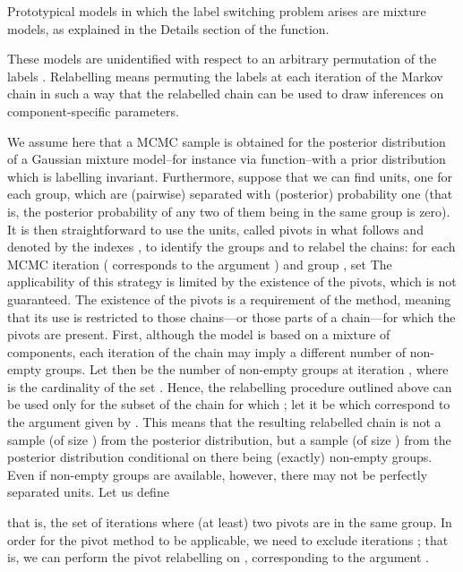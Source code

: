 \documentclass[a4paper]{book}
\begin{document}
\begin{Details}\relax
Prototypical models in which the label switching problem arises
are mixture models, as explained in the Details section of
the  function.

These models are unidentified with respect to an arbitrary permutation
of the labels . Relabelling means permuting
the labels at each iteration of the Markov chain in such
a way that the relabelled chain can be used to draw inferences
on component-specific parameters.


We assume here that a MCMC sample is obtained for the
posterior distribution of a Gaussian mixture model--for instance via
 function--with a prior distribution which is
labelling invariant.
Furthermore, suppose that we can find  units, one
for each group, which are (pairwise) separated with (posterior)
probability one
(that is, the posterior probability of any two of them being
in the same group
is zero).
It is then straightforward to use the  units,
called pivots in what follows and denoted by the indexes
, to identify the groups and to
relabel the chains:
for each MCMC iteration  ( corresponds to
the argument ) and group
, set
The applicability of this strategy is limited by the existence of the pivots,
which is not guaranteed. The existence of the pivots is a requirement of the
method, meaning that its use is restricted to those chains—or
those parts of a chain—for which the pivots are present. First, although the
model is based on a mixture of  components, each iteration of the chain
may imply a different number of non-empty groups. Let then 
be the number of non-empty groups at iteration ,
where  is the cardinality of the set . Hence, the relabelling
procedure outlined above can be used only for the subset of the chain
for which ; let it be 
which correspond to the argument  given by .
This means that the resulting relabelled chain is not a sample (of size )
from the posterior distribution, but a sample (of size )
from the posterior
distribution conditional on there being (exactly)  non-empty groups.
Even if  non-empty groups are available, however,
there may not be  perfectly separated units. Let us define

that is, the set of iterations where (at least) two pivots are in the same
group.
In order for the pivot method to be applicable,
we need to exclude iterations ;
that is, we can perform the pivot relabelling on , corresponding to the argument .
\end{Details}
\end{document}

